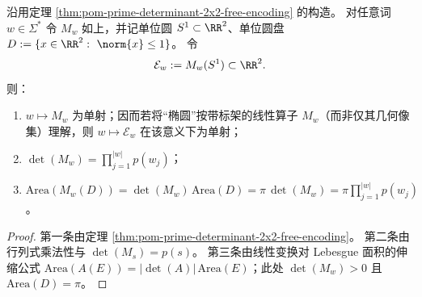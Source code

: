 \begin{corollary}[线性椭圆像的素数面积账本与顺序账本分离]\label{cor:pom-prime-determinant-ellipse-ledger}
沿用定理 \ref{thm:pom-prime-determinant-2x2-free-encoding} 的构造。
对任意词 \(w\in\Sigma^{*}\) 令 \(M_w\) 如上，并记单位圆 \(S^{1}\subset\RR^{2}\)、单位圆盘 \(D:=\{x\in\RR^{2}:\ \norm{x}\le 1\}\)。
令
\[
\mathcal{E}_w:=M_w(S^{1})\subset\RR^{2}.
\]
则：
\begin{enumerate}
  \item \(w\mapsto M_w\) 为单射；因而若将“椭圆”按带标架的线性算子 \(M_w\)（而非仅其几何像集）理解，则 \(w\mapsto \mathcal{E}_w\) 在该意义下为单射；
  \item \(\det(M_w)=\prod_{j=1}^{|w|}p(w_j)\)；
  \item \(\mathrm{Area}(M_w(D))=\det(M_w)\,\mathrm{Area}(D)=\pi\,\det(M_w)=\pi\prod_{j=1}^{|w|}p(w_j)\)。
\end{enumerate}
\end{corollary}
\begin{proof}
第一条由定理 \ref{thm:pom-prime-determinant-2x2-free-encoding}。
第二条由行列式乘法性与 \(\det(M_s)=p(s)\)。
第三条由线性变换对 Lebesgue 面积的伸缩公式 \(\mathrm{Area}(A(E))=|\det(A)|\,\mathrm{Area}(E)\)；此处 \(\det(M_w)>0\) 且 \(\mathrm{Area}(D)=\pi\)。
\end{proof}

